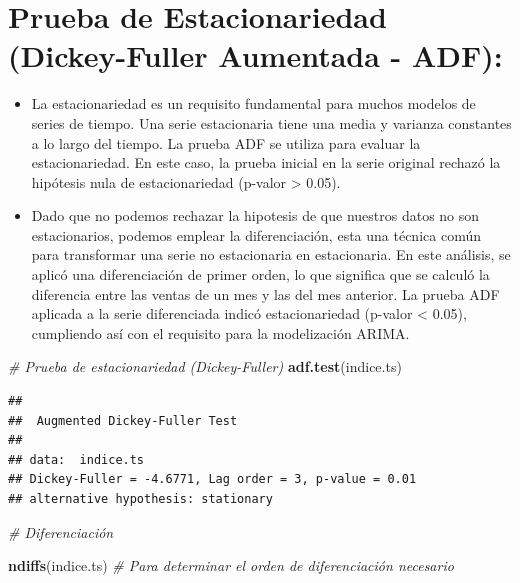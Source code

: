 \documentclass[
]{book}
\newenvironment{Shaded}{\begin{snugshade}}{\end{snugshade}}
\newcommand{\CommentTok}[1]{\textcolor[rgb]{0.56,0.35,0.01}{\textit{#1}}}
\newcommand{\FunctionTok}[1]{\textcolor[rgb]{0.13,0.29,0.53}{\textbf{#1}}}
\newcommand{\NormalTok}[1]{#1}
\begin{document}
\section{Prueba de Estacionariedad (Dickey-Fuller Aumentada - ADF):}\label{prueba-de-estacionariedad-dickey-fuller-aumentada---adf}

\begin{itemize}
\item
  La estacionariedad es un requisito fundamental para muchos modelos de series de tiempo. Una serie estacionaria tiene una media y varianza constantes a lo largo del tiempo. La prueba ADF se utiliza para evaluar la estacionariedad. En este caso, la prueba inicial en la serie original rechazó la hipótesis nula de estacionariedad (p-valor \textgreater{} 0.05).
\item
  Dado que no podemos rechazar la hipotesis de que nuestros datos no son estacionarios, podemos emplear la diferenciación, esta una técnica común para transformar una serie no estacionaria en estacionaria. En este análisis, se aplicó una diferenciación de primer orden, lo que significa que se calculó la diferencia entre las ventas de un mes y las del mes anterior. La prueba ADF aplicada a la serie diferenciada indicó estacionariedad (p-valor \textless{} 0.05), cumpliendo así con el requisito para la modelización ARIMA.
\end{itemize}

\begin{Shaded}
\begin{Highlighting}[]
\CommentTok{\# Prueba de estacionariedad (Dickey{-}Fuller)}
\FunctionTok{adf.test}\NormalTok{(indice.ts)}
\end{Highlighting}
\end{Shaded}

\begin{verbatim}
## 
##  Augmented Dickey-Fuller Test
## 
## data:  indice.ts
## Dickey-Fuller = -4.6771, Lag order = 3, p-value = 0.01
## alternative hypothesis: stationary
\end{verbatim}

\begin{Shaded}
\begin{Highlighting}[]
\CommentTok{\# Diferenciación}

\FunctionTok{ndiffs}\NormalTok{(indice.ts) }\CommentTok{\# Para determinar el orden de diferenciación necesario}
\end{Highlighting}
\end{Shaded}
\end{document}
